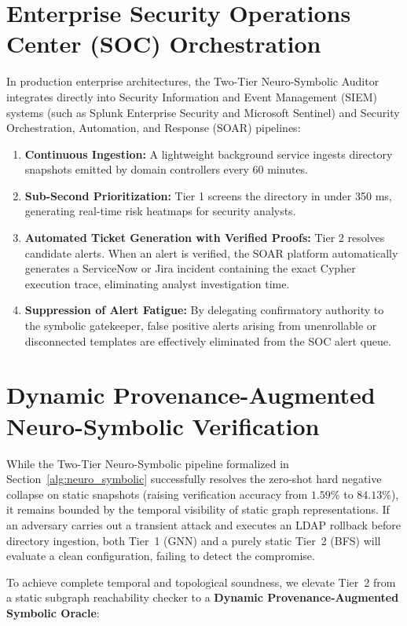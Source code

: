 \section{Enterprise Security Operations Center (SOC) Orchestration}
In production enterprise architectures, the Two-Tier Neuro-Symbolic Auditor integrates directly into Security Information and Event Management (SIEM) systems (such as Splunk Enterprise Security and Microsoft Sentinel) and Security Orchestration, Automation, and Response (SOAR) pipelines:
\begin{enumerate}
    \item \textbf{Continuous Ingestion:} A lightweight background service ingests directory snapshots emitted by domain controllers every 60 minutes.
    \item \textbf{Sub-Second Prioritization:} Tier 1 screens the directory in under 350 ms, generating real-time risk heatmaps for security analysts.
    \item \textbf{Automated Ticket Generation with Verified Proofs:} Tier 2 resolves candidate alerts. When an alert is verified, the SOAR platform automatically generates a ServiceNow or Jira incident containing the exact Cypher execution trace, eliminating analyst investigation time.
    \item \textbf{Suppression of Alert Fatigue:} By delegating confirmatory authority to the symbolic gatekeeper, false positive alerts arising from unenrollable or disconnected templates are effectively eliminated from the SOC alert queue.
\end{enumerate}

\section{Dynamic Provenance-Augmented Neuro-Symbolic Verification}
\label{sec:dynamic_neuro_symbolic}
While the Two-Tier Neuro-Symbolic pipeline formalized in Section~\ref{alg:neuro_symbolic} successfully resolves the zero-shot hard negative collapse on static snapshots (raising verification accuracy from $1.59\%$ to $84.13\%$), it remains bounded by the temporal visibility of static graph representations. If an adversary carries out a transient attack and executes an LDAP rollback before directory ingestion, both Tier~1 (GNN) and a purely static Tier~2 (BFS) will evaluate a clean configuration, failing to detect the compromise.

To achieve complete temporal and topological soundness, we elevate Tier~2 from a static subgraph reachability checker to a \textbf{Dynamic Provenance-Augmented Symbolic Oracle}:

